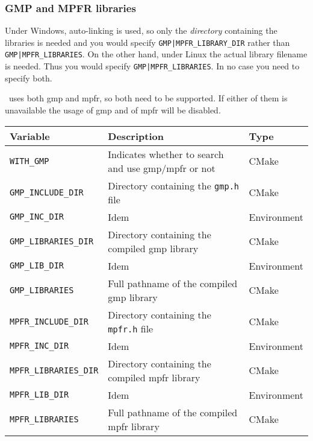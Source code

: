\subsubsection{GMP and MPFR libraries}

Under Windows, auto-linking is used, so only the {\em directory} 
containing the libraries is needed and you would specify \texttt{GMP|MPFR\_LIBRARY\_DIR} rather than
\texttt{GMP|MPFR\_LIBRARIES}. On the other hand, under Linux the actual library filename is needed.
Thus you would specify \texttt{GMP|MPFR\_LIBRARIES}. In no case you need to specify both.

\cgal\ uses both gmp and mpfr, so both need to be supported. If either of them is unavailable the 
usage of gmp and of mpfr will be disabled.

{\ccTexHtml{\small}{}
\renewcommand{\arraystretch}{1.3}
\gdef\lcTabularBorder{2}
\begin{tabular}{|l|l|l|} \hline
  \textbf{Variable}             & \textbf{Description}                                & \textbf{Type}\\\hline\hline
  \texttt{WITH\_GMP}            & Indicates whether to search and use gmp/mpfr or not & CMake\\\hline
  \texttt{GMP\_INCLUDE\_DIR}    & Directory containing the \texttt{gmp.h} file        & CMake\\\hline
  \texttt{GMP\_INC\_DIR}        & Idem                                                & Environment\\\hline
  \texttt{GMP\_LIBRARIES\_DIR}  & Directory containing the compiled gmp library       & CMake\\\hline
  \texttt{GMP\_LIB\_DIR}        & Idem                                                & Environment\\\hline
  \texttt{GMP\_LIBRARIES}       & Full pathname of the compiled gmp library           & CMake\\\hline
  \texttt{MPFR\_INCLUDE\_DIR}   & Directory containing the \texttt{mpfr.h} file       & CMake\\\hline
  \texttt{MPFR\_INC\_DIR}       & Idem                                                & Environment\\\hline
  \texttt{MPFR\_LIBRARIES\_DIR} & Directory containing the compiled mpfr library      & CMake\\\hline
  \texttt{MPFR\_LIB\_DIR}       & Idem                                                & Environment\\\hline
  \texttt{MPFR\_LIBRARIES}      & Full pathname of the compiled mpfr library          & CMake\\\hline
\end{tabular}
}

